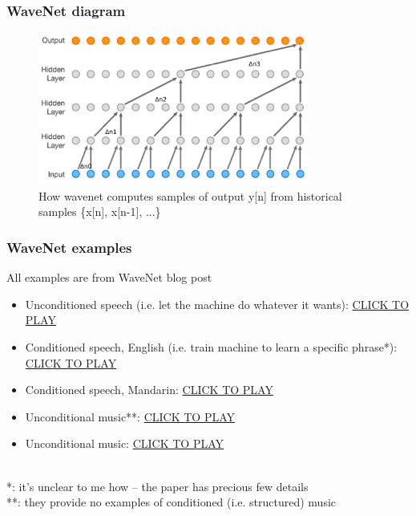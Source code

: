 \documentclass{beamer}
\begin{document}

\begin{frame}
	\frametitle{WaveNet diagram}
	\begin{figure}
	\includegraphics[height=5cm]{./7_wavenet_annot.png}
		\caption{How wavenet computes samples of output y[n] from historical samples \{x[n], x[n-1], ...\}}
	\end{figure}
\end{frame}


\begin{frame}
	\frametitle{WaveNet examples}
	All examples are from WaveNet blog post
	\begin{itemize}
		\item
			Unconditioned speech (i.e. let the machine do whatever it wants): \href{run:./wavenet_speech_unconditional.wav}{CLICK TO PLAY}
		\item
			Conditioned speech, English (i.e. train machine to learn a specific phrase*): \href{run:./wavenet_speech_conditioned_english.wav}{CLICK TO PLAY}
		\item
			Conditioned speech, Mandarin: \href{run:./wavenet_speech_conditioned_mandarin.wav}{CLICK TO PLAY}
		\item
			Unconditional music**: \href{run:./wavenet_sample_1.wav}{CLICK TO PLAY}
		\item
			Unconditional music: \href{run:./wavenet_sample_2.wav}{CLICK TO PLAY}
	\end{itemize}\ \\
	\vspace{1em}
	*: it's unclear to me how -- the paper has precious few details\\
	**: they provide no examples of conditioned (i.e. structured) music
\end{frame}
\end{document}
